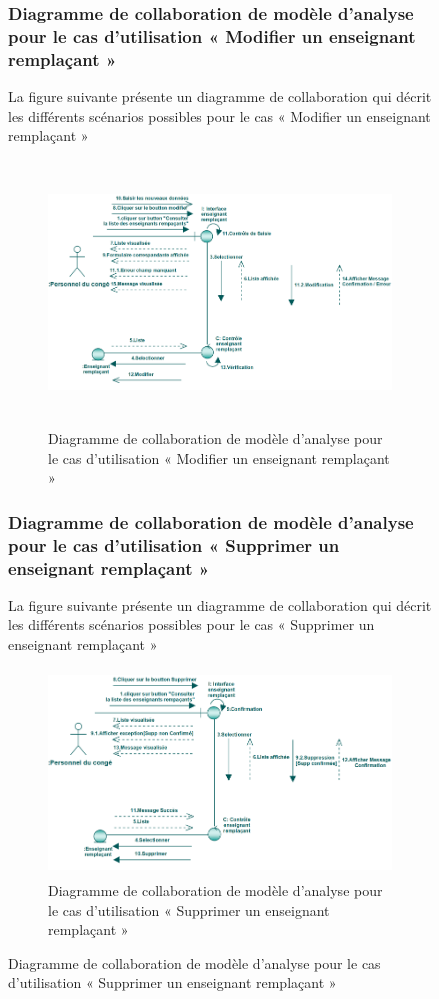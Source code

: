 \documentclass[12 pt]{report}
\begin{document}
\begin{figure}[h]
\begin{center}
\subsubsection{Diagramme  de  collaboration  de  modèle  d'analyse  pour  le  cas  d'utilisation « Modifier un enseignant remplaçant »   }
La figure suivante présente un diagramme de collaboration qui décrit les différents
scénarios possibles pour le cas « Modifier un enseignant remplaçant »  
\begin{figure}[h]
\begin{center}
\includegraphics[width= 12 cm , height =7cm]{colla_mod_rem.PNG}
 \caption{Diagramme  de  collaboration  de  modèle  d'analyse  pour  le  cas  d'utilisation « Modifier un enseignant remplaçant »  }
\end{center}
\end{figure}
\subsubsection{Diagramme  de  collaboration  de  modèle  d'analyse  pour  le  cas  d'utilisation « Supprimer un enseignant remplaçant »   }
La figure suivante présente un diagramme de collaboration qui décrit les différents
scénarios possibles pour le cas « Supprimer un enseignant remplaçant »  
\begin{figure}[h]
\begin{center}
\includegraphics[width= 12 cm , height =5.5cm]{colla_sup_rem.PNG}
 \caption{Diagramme  de  collaboration  de  modèle  d'analyse  pour  le  cas  d'utilisation « Supprimer un enseignant remplaçant »  }
\end{center}
\end{figure}

\end{center}
\end{figure}
\end{document}
